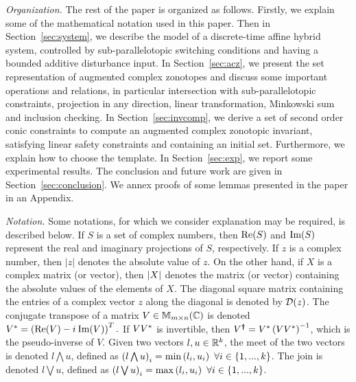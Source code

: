 \emph{Organization.}  The rest of the paper is organized as follows.  Firstly, we explain
some of the mathematical notation used in this paper.  Then in
Section~\ref{sec:system}, we describe the model of a discrete-time
affine hybrid system, controlled by sub-parallelotopic switching
conditions and having a bounded additive disturbance input. In
Section~\ref{sec:acz}, we present the set representation of augmented
complex zonotopes and discuss some important operations and relations, in particular intersection with sub-parallelotopic constraints, projection in any direction, linear transformation, Minkowski sum and inclusion checking.  In
Section~\ref{sec:invcomp}, we derive a set of second order conic
constraints to compute an augmented complex zonotopic invariant,
satisfying linear safety constraints and containing an initial set.
Furthermore, we explain how to choose the template.  In
Section~\ref{sec:exp}, we report some experimental results.  The
conclusion and future work are given in Section~\ref{sec:conclusion}.
We annex proofs of some lemmas presented in the paper in an
Appendix.

\emph{Notation.} Some notations, for which we
consider explanation may be required, is described below.  If $S$ is a
set of complex numbers, then $\operatorname{\operatorname{Re}}(S)$ and $\operatorname{\operatorname{Im}}(S)$ represent the
real and imaginary projections of $S$, respectively.  If $z$ is a
complex number, then $|z|$ denotes the absolute value of $z$.  On the
other hand, if $X$ is a complex matrix (or vector), then $\left|X\right|$
denotes the matrix (or vector) containing the absolute values of the
elements of $X$.  The diagonal square matrix containing the entries of
a complex vector $z$ along the diagonal is denoted by $\mathcal{D}(z)$.  The
conjugate transpose of a matrix $V\in\mathbb{M}_{m\times n}(\mathbb{\mathbb{C}})$ is
denoted $V^* = \left(\operatorname{\operatorname{Re}}(V)-{i\mkern1mu}\operatorname{\operatorname{Im}}(V)\right)^T.$ If
$VV^*$ is invertible, then
$V^{\bm{\dagger}}= V^*\left(VV^*\right)^{-1}$, which is
the pseudo-inverse of $V$.  Given two vectors $l,u\in\mathbb{R}^k$, the
meet of the two vectors is denoted $l\bigwedge u$, defined as
$\left(l\bigwedge u\right)_i=\min\left(l_i,u_i\right)~\forall i\in\{1,...,k\}$.  The
join is denoted $l\bigvee u$, defined as $\left(l\bigvee
u\right)_i=\max\left(l_i,u_i\right)~\forall i\in\{1,...,k\}$.
